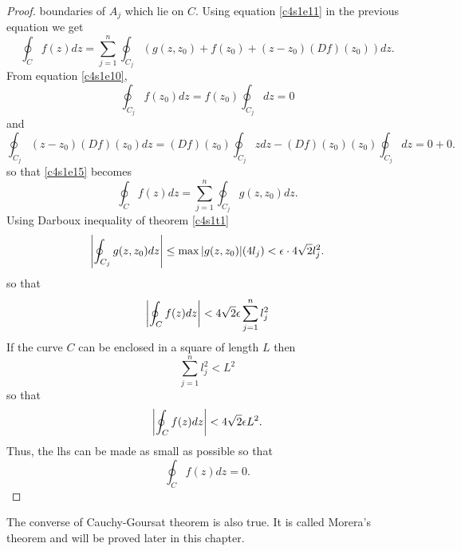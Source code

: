 \begin{proof}
boundaries of $A_j$ which lie on $C$. Using equation \eqref{c4s1e11} in the
previous equation we get
\begin{equation}\label{c4s1e15}
\oint_C f(z)dz = \sum_{j=1}^n \oint_{C_j}\left(g(z,z_0) + f(z_0) + (z - z_0)
(Df)(z_0)\right)dz.
\end{equation}
From equation \eqref{c4s1e10},
\[
\oint_{C_j}f(z_0)dz = f(z_0)\oint_{C_j}dz = 0
\]
and
\[
\oint_{C_j}(z - z_0)(Df)(z_0)dz = (Df)(z_0)\oint_{C_j}zdz - (Df)(z_0)(z_0)
\oint_{C_j}dz = 0 + 0.
\]
so that \eqref{c4s1e15} becomes
\begin{equation}\label{c4s1e16}
\oint_C f(z)dz = \sum_{j=1}^n \oint_{C_j}g(z,z_0)dz.
\end{equation}
Using Darboux inequality of theorem \ref{c4s1t1}
\[
\left\vert{\oint_{C_j} g(z,z_0)dz}\right\vert \le \max{\left\vert{g(z,z_0)}\right\vert}(4l_j) < \epsilon \cdot
4\sqrt{2}l_j^2.
\]
so that
\[
\left\vert{\oint_C f(z)dz}\right\vert < 4\sqrt{2}\epsilon \sum_{j=1}^n l_j^2
\]
If the curve $C$ can be enclosed in a square of length $L$ then
\[
\sum_{j=1}^n l_j^2 < L^2
\] 
so that
\[
\left\vert{\oint_C f(z)dz}\right\vert < 4\sqrt{2}\epsilon L^2.
\]
Thus, the lhs can be made as small as possible so that
\[
\oint_C f(z)dz = 0.
\]
\end{proof}

\begin{rem}
The converse of Cauchy-Goursat theorem is also true. It is called Morera's 
theorem and will be proved later in this chapter.
\end{rem}


